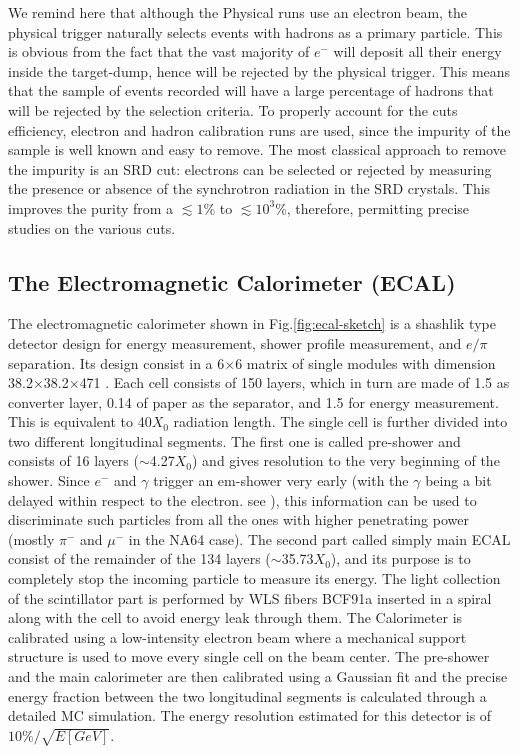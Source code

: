 We remind here that although the Physical runs use an electron beam, the physical trigger naturally selects events with hadrons as a primary particle. This is obvious from the fact that the vast majority of $e^-$ will deposit all their energy inside the target-dump, hence will be rejected by the physical trigger. This means that the sample of events recorded will have a large percentage of hadrons that will be rejected by the selection criteria. To properly account for the cuts efficiency, electron and hadron calibration runs are used, since the impurity of the sample is well known and easy to remove. The most classical approach to remove the impurity is an SRD cut: electrons can be selected or rejected by measuring the presence or absence of the synchrotron radiation in the SRD crystals. This improves the purity from a $\lesssim 1\%$ to $\lesssim 10^{3}\%$, therefore, permitting precise studies on the various cuts. 

\subsection{The Electromagnetic Calorimeter (ECAL)}
\label{ch2:sec:detectors-ecal}

The electromagnetic calorimeter shown in Fig.\ref{fig:ecal-sketch} is a shashlik type detector design for energy measurement, shower profile measurement, and $e/\pi$ separation. Its design consist in a 6$\times$6 matrix of single modules with dimension 38.2$\times$38.2$\times$471 \mmc. Each cell consists of 150 layers, which in turn are made of 1.5 \mmi as converter layer, 0.14 \mmi of paper as the separator, and 1.5 \mmi for energy measurement. This is equivalent to 40$X_0$ radiation length. The single cell is further divided into two different longitudinal segments. The first one is called pre-shower and consists of 16 layers ($\sim$4.27$X_0$) and gives resolution to the very beginning of the shower. Since $e^-$ and $\gamma$ trigger an em-shower very early (with the $\gamma$ being a bit delayed within respect to the electron. see \cite{Bichsel:2002cf}), this information can be used to discriminate such particles from all the ones with higher penetrating power (mostly $\pi^-$ and $\mu^-$ in the NA64 case). The second part called simply main ECAL consist of the remainder of the 134 layers ($\sim$35.73$X_0$), and its purpose is to completely stop the incoming particle to measure its energy. The light collection of the scintillator part is performed by WLS fibers BCF91a \cite{wls-fibers} inserted in a spiral along with the cell to avoid energy leak through them. The Calorimeter is calibrated using a low-intensity electron beam where a mechanical support structure is used to move every single cell on the beam center. The pre-shower and the main calorimeter are then calibrated using a Gaussian fit and the precise energy fraction between the two longitudinal segments is calculated through a detailed MC simulation. The energy resolution estimated for this detector is of $10\% / \sqrt{E[GeV]}$.

